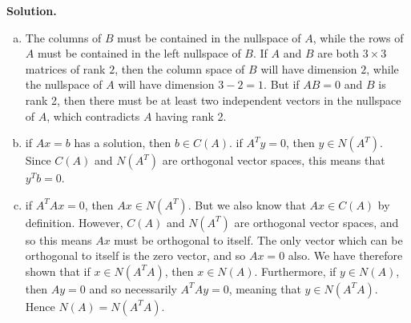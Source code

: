 \documentclass[11pt]{article}
\begin{document}
\noindent \textbf{Solution. }\\
\begin{enumerate}[(a)]
\item The columns of $B$ must be contained in the nullspace of $A$, while the rows of $A$ must be contained in the left nullspace of $B$. If $A$ and $B$ are both $3\times 3$ matrices of rank $2$, then the column space of $B$ will have dimension $2$, while the nullspace of $A$ will have dimension $3-2=1$. But if $AB=0$ and $B$ is rank 2, then there must be at least two independent vectors in the nullspace of $A$, which contradicts $A$ having rank 2.
\item if $Ax=b$ has a solution, then $b\in C(A)$. if $A^Ty = 0$, then $y\in N(A^T)$. Since $C(A)$ and $N(A^T)$ are orthogonal vector spaces, this means that $y^Tb = 0$. 
\item if $A^TAx=0$, then $Ax \in N(A^T)$. But we also know that $Ax\in C(A)$ by definition. However, $C(A)$ and $N(A^T)$ are orthogonal vector spaces, and so this means $Ax$ must be orthogonal to itself. The only vector which can be orthogonal to itself is the zero vector, and so $Ax =0$ also. We have therefore shown that if $x\in N(A^TA)$, then $x\in N(A)$. Furthermore, if $y\in N(A)$, then $Ay = 0$ and so necessarily $A^TAy = 0$, meaning that $y\in N(A^TA)$. Hence $N(A)=N(A^TA)$. 
\end{enumerate}

\newpage
\end{document}
